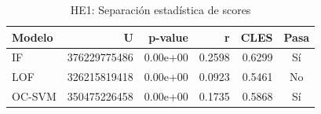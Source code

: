 \begin{table}[htbp]
\centering
\small
\caption{HE1: Separación estadística de scores}
\label{tab:he1-results}
\begin{tabular}{lrrrrc}
\toprule
Modelo & U & p-value & r & CLES & Pasa \\
\midrule
  IF & 376229775486 & 0.00e+00 & 0.2598 & 0.6299 & Sí \\
  LOF & 326215819418 & 0.00e+00 & 0.0923 & 0.5461 & No \\
  OC-SVM & 350475226458 & 0.00e+00 & 0.1735 & 0.5868 & Sí \\
\bottomrule
\end{tabular}
\end{table}
